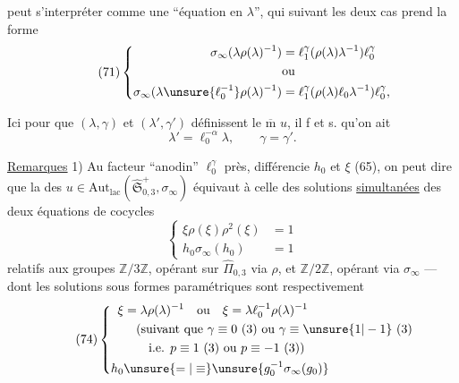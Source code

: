 
peut s'interpréter comme une ``équation en $\lambda$'', qui suivant les deux cas prend la forme
\[
\tag{71}
\left\{
\begin{aligned}
\sigma_\infty(\lambda\rho(\lambda)^{-1})
 &=\ell_1^\gamma(\rho(\lambda)\lambda^{-1})\ell_0^\gamma\\
&\text{ou}\\
\sigma_\infty(\lambda\unsure{\ell_0^{-1}}\rho(\lambda)^{-1})
 &=\ell_1^\gamma(\rho(\lambda)\ell_0\lambda^{-1})\ell_0^\gamma,
\end{aligned}
\right.
\]

Ici pour que $(\lambda,\gamma)$ et $(\lambda',\gamma')$ définissent le $\overline{\mathrm m}$ $u$, il f et s. qu'on ait 
\[
\tag{72}
\lambda'=\ell_0^{-\alpha}\lambda,\qquad\gamma=\gamma'.
\]

\uline{Remarques} 1) Au facteur ``anodin'' $\ell_0^\gamma$ près,  différencie $h_0$ et $\xi$ (65), on peut dire que la  des
$u\in\mathrm{Aut}_{\mathrm{lac}}(\widehat{\mathfrak S}_{0,3}^{+},\sigma_\infty)$
équivaut à celle des  solutions \uline{simultanées} des deux équations de cocycles
\[
\tag{73}
\left\{
\begin{aligned}
\xi\rho(\xi)\rho^2(\xi)&=1\\
h_0\sigma_\infty(h_0)&=1
\end{aligned}
\right.
\]
relatifs  aux groupes $\mathbb Z/3\mathbb Z$, opérant sur $\widehat{\Pi}_{0,3}$ via $\rho$, et $\mathbb Z/2\mathbb Z$, opérant via $\sigma_\infty$ --- dont les solutions sous formes paramétriques sont respectivement
\[
\tag{74}
\left\{
\begin{aligned}
\xi&=\lambda\rho(\lambda)^{-1}\quad\text{ou}\quad
 \xi=\lambda \ell_0^{-1}\rho(\lambda)^{-1}\\
&\quad\text{(suivant que }\gamma\equiv0\ (3)\text{ ou }\gamma\equiv\unsure{1|-1}\ (3)\\
&\qquad\text{i.e. }p\equiv1\ (3)\text{ ou }p\equiv-1\ (3)\text{)}\\
h_0&\unsure{=|\equiv}\unsure{g_0^{-1}\sigma_\infty(g_0)}
\end{aligned}
\right.
\]


